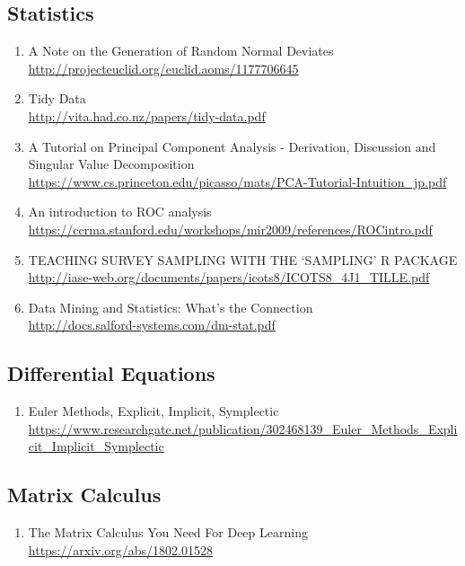\documentclass{article}
\begin{document}
\subsection {Statistics}
\begin{enumerate}
	\item {A Note on the Generation of Random Normal Deviates\\
\url{http://projecteuclid.org/euclid.aoms/1177706645}}
	\item {Tidy Data\\
\url{http://vita.had.co.nz/papers/tidy-data.pdf}}
	\item {A Tutorial on Principal Component Analysis - Derivation, Discussion and Singular Value Decomposition\\
\url{https://www.cs.princeton.edu/picasso/mats/PCA-Tutorial-Intuition_jp.pdf}}
	\item{An introduction to ROC analysis\\
\url{https://ccrma.stanford.edu/workshops/mir2009/references/ROCintro.pdf}}
	\item{TEACHING SURVEY SAMPLING WITH THE ‘SAMPLING’ R PACKAGE
	\url{http://iase-web.org/documents/papers/icots8/ICOTS8_4J1_TILLE.pdf}}
	\item{Data Mining and Statistics: What's the Connection\\ \url{http://docs.salford-systems.com/dm-stat.pdf}}
\end{enumerate}

\subsection{Differential Equations}
\begin{enumerate}
	\item {Euler Methods, Explicit, Implicit, Symplectic\\
\url{https://www.researchgate.net/publication/302468139_Euler_Methods_Explicit_Implicit_Symplectic}}
\end{enumerate}

\subsection {Matrix Calculus}
\begin{enumerate}
	\item {The Matrix Calculus You Need For Deep Learning\\
		\url{https://arxiv.org/abs/1802.01528}}
\end{enumerate}
\end{document}
